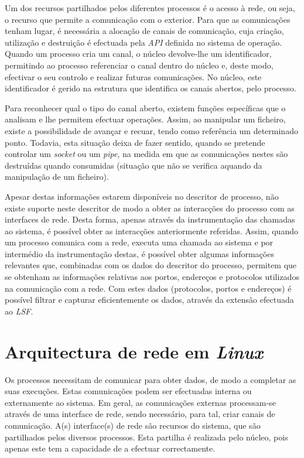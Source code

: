 Um dos recursos partilhados pelos diferentes processos é o acesso à rede, ou seja, o recurso que permite a comunicação com o exterior.
Para que as comunicações tenham lugar, é necessária a alocação de canais de comunicação, cuja criação, utilização e destruição é efectuada pela \textit{API} definida no sistema de operação.
Quando um processo cria um canal, o núcleo devolve-lhe um identificador, permitindo ao processo referenciar o canal dentro do núcleo e, deste modo, efectivar o seu controlo e realizar futuras comunicações.
No núcleo, este identificador é gerido na estrutura que identifica os canais abertos, pelo processo.

Para reconhecer qual o tipo do canal aberto, existem funções específicas que o analisam e lhe permitem efectuar operações.
Assim, ao manipular um ficheiro, existe a possibilidade de avançar e recuar, tendo como referência um determinado ponto.
Todavia, esta situação deixa de fazer sentido, quando se pretende controlar um \textit{socket} ou um \textit{pipe}, na medida em que as comunicações nestes são destruídas quando consumidas (situação que não se verifica aquando da manipulação de um ficheiro).

Apesar destas informações estarem disponíveis no descritor de processo, não existe suporte neste descritor de modo a obter as interacções do processo com as interfaces de rede.
Desta forma, apenas através da instrumentação das chamadas ao sistema, é possível obter as interacções anteriormente referidas.
Assim, quando um processo comunica com a rede, executa uma chamada ao sistema e por intermédio da instrumentação destas, é possível obter algumas informações relevantes que, combinadas com os dados do descritor do processo, permitem que se obtenham as informações relativas aos portos, endereços e protocolos utilizados na comunicação com a rede.
Com estes dados (protocolos, portos e endereços) é possível filtrar e capturar eficientemente os dados, através da extensão efectuada ao \textit{LSF}.

\section{Arquitectura de rede em \textit{Linux}}
\label{sub:network}

Os processos necessitam de comunicar para obter dados, de modo a completar as suas execuções.
Estas comunicações podem ser efectuadas interna ou externamente ao sistema.
Em geral, as comunicações externas processam-se através de uma interface de rede, sendo necessário, para tal, criar canais de comunicação.
A(s) interface(s) de rede são recursos do sistema, que são partilhados pelos diversos processos.
Esta partilha é realizada pelo núcleo, pois apenas este tem a capacidade de a efectuar correctamente.

